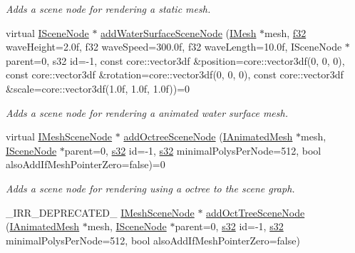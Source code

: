 \begin{DoxyCompactItemize}
\begin{DoxyCompactList}\small\item\em Adds a scene node for rendering a static mesh. \end{DoxyCompactList}\item 
virtual \hyperlink{classirr_1_1scene_1_1ISceneNode}{I\+Scene\+Node} $\ast$ \hyperlink{classirr_1_1scene_1_1ISceneManager_a5f5beb6271d3ab753687400dd6573044}{add\+Water\+Surface\+Scene\+Node} (\hyperlink{classirr_1_1scene_1_1IMesh}{I\+Mesh} $\ast$mesh, \hyperlink{namespaceirr_a0277be98d67dc26ff93b1a6a1d086b07}{f32} wave\+Height=2.\+0f, f32 wave\+Speed=300.\+0f, f32 wave\+Length=10.\+0f, I\+Scene\+Node $\ast$parent=0, s32 id=-\/1, const core\+::vector3df \&position=core\+::vector3df(0, 0, 0), const core\+::vector3df \&rotation=core\+::vector3df(0, 0, 0), const core\+::vector3df \&scale=core\+::vector3df(1.\+0f, 1.\+0f, 1.\+0f))=0
\begin{DoxyCompactList}\small\item\em Adds a scene node for rendering a animated water surface mesh. \end{DoxyCompactList}\item 
virtual \hyperlink{classirr_1_1scene_1_1IMeshSceneNode}{I\+Mesh\+Scene\+Node} $\ast$ \hyperlink{classirr_1_1scene_1_1ISceneManager_a503339385ca2b33d7e8035a61c4eca84}{add\+Octree\+Scene\+Node} (\hyperlink{classirr_1_1scene_1_1IAnimatedMesh}{I\+Animated\+Mesh} $\ast$mesh, \hyperlink{classirr_1_1scene_1_1ISceneNode}{I\+Scene\+Node} $\ast$parent=0, \hyperlink{namespaceirr_ac66849b7a6ed16e30ebede579f9b47c6}{s32} id=-\/1, \hyperlink{namespaceirr_ac66849b7a6ed16e30ebede579f9b47c6}{s32} minimal\+Polys\+Per\+Node=512, bool also\+Add\+If\+Mesh\+Pointer\+Zero=false)=0
\begin{DoxyCompactList}\small\item\em Adds a scene node for rendering using a octree to the scene graph. \end{DoxyCompactList}\item 
\+\_\+\+I\+R\+R\+\_\+\+D\+E\+P\+R\+E\+C\+A\+T\+E\+D\+\_\+ \hyperlink{classirr_1_1scene_1_1IMeshSceneNode}{I\+Mesh\+Scene\+Node} $\ast$ \hyperlink{classirr_1_1scene_1_1ISceneManager_ad976720f7b110b47374e129b29e4e572}{add\+Oct\+Tree\+Scene\+Node} (\hyperlink{classirr_1_1scene_1_1IAnimatedMesh}{I\+Animated\+Mesh} $\ast$mesh, \hyperlink{classirr_1_1scene_1_1ISceneNode}{I\+Scene\+Node} $\ast$parent=0, \hyperlink{namespaceirr_ac66849b7a6ed16e30ebede579f9b47c6}{s32} id=-\/1, \hyperlink{namespaceirr_ac66849b7a6ed16e30ebede579f9b47c6}{s32} minimal\+Polys\+Per\+Node=512, bool also\+Add\+If\+Mesh\+Pointer\+Zero=false)

\end{DoxyCompactItemize}
